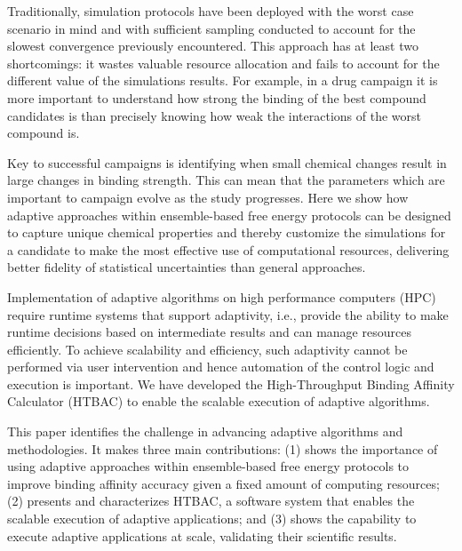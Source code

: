 Traditionally, simulation protocols have been deployed with the worst case
scenario in mind and with sufficient sampling conducted to account for the
slowest convergence previously encountered. This approach has at least two
shortcomings: it wastes valuable resource allocation and fails to account
for the different value of the simulations results. For example, in a drug
campaign it is more important to understand how strong the binding of the
best compound candidates is than precisely knowing how weak the interactions
of the worst compound is.

Key to successful campaigns is identifying when small chemical changes result
in large changes in binding strength. This can mean that the parameters which
are important to campaign evolve as the study progresses. Here we show how
adaptive approaches within ensemble-based free energy protocols can be
designed to capture unique chemical properties and thereby customize the
simulations for a candidate to make the most effective use of computational
resources, delivering better fidelity of statistical uncertainties than
general approaches.

Implementation of adaptive algorithms on high performance computers (HPC)
require runtime systems that support adaptivity, i.e., provide the ability to
make runtime decisions based on intermediate results and can manage resources
efficiently. To achieve scalability and efficiency, such adaptivity cannot be
performed via user intervention and hence automation of the control logic and
execution is important. We have developed the High-Throughput Binding
Affinity Calculator (HTBAC) to enable the scalable execution of adaptive
algorithms.

This paper identifies the challenge in advancing adaptive algorithms and
methodologies. It makes three main contributions: (1) shows the importance of using
adaptive approaches within ensemble-based free energy protocols to improve
binding affinity accuracy given a fixed amount of computing resources; (2)
presents and characterizes HTBAC, a software system that enables the scalable
execution of adaptive applications; and (3) shows the capability to execute
adaptive applications at scale, validating their scientific results.
%

